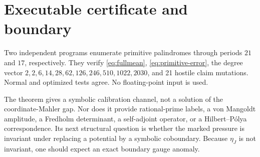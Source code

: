 \documentclass[11pt]{article}
\begin{document}
\section{Executable certificate and boundary}

Two independent programs enumerate primitive palindromes through periods
$21$ and $17$, respectively.  They verify \eqref{eq:fullmean},
\eqref{eq:primitive-error}, the degree vector
$2,2,6,14,28,62,126,246,510,1022,2030$, and 21 hostile claim mutations.
Normal and optimized tests agree.  No floating-point input is used.

The theorem gives a symbolic calibration channel, not a solution of the
coordinate-Mahler gap.  Nor does it provide rational-prime labels, a
von Mangoldt amplitude, a Fredholm determinant, a self-adjoint operator, or
a Hilbert--P\'olya correspondence.  Its next structural question is whether
the marked pressure is invariant under replacing a potential by a symbolic
coboundary.  Because $\eta_J$ is not invariant, one should expect an exact
boundary gauge anomaly.



\end{document}
